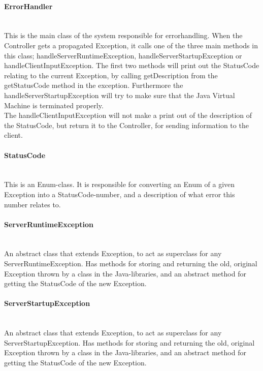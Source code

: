 \documentclass[a4paper,10pt,titlepage]{article}
\begin{document}
				\paragraph{ErrorHandler}\mbox{}\\
This is the main class of the system responsible for errorhandling. When the Controller gets a propagated Exception, it calls one of the three main methods in this class; handleServerRuntimeException, handleServerStartupException or handleClientInputException. The first two methods will print out the StatusCode relating to the current Exception, by calling getDescription from the getStatusCode method in the exception. Furthermore the handleServerStartupException will try to make sure that the Java Virtual Machine is terminated properly.\\
The handleClientInputException will not make a print out of the description of the StatusCode, but return it to the Controller, for sending information to the client.

				\paragraph{StatusCode}\mbox{}\\
This is an Enum-class. It is responsible for converting an Enum of a given Exception into a StatusCode-number, and a description of what error this number relates to.
				
				\paragraph{ServerRuntimeException}\mbox{}\\
An abstract class that extends Exception, to act as superclass for any ServerRuntimeException. Has methods for storing and returning the old, original Exception thrown by a class in the Java-libraries, and an abstract method for getting the StatusCode of the new Exception.
				
				\paragraph{ServerStartupException}\mbox{}\\
An abstract class that extends Exception, to act as superclass for any ServerStartupException. Has methods for storing and returning the old, original Exception thrown by a class in the Java-libraries, and an abstract method for getting the StatusCode of the new Exception.
\end{document}
